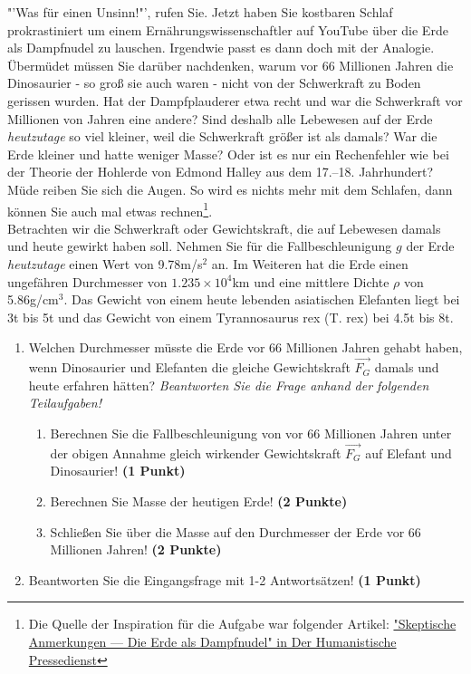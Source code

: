 \documentclass[a4paper, 9pt]{scrartcl}\usepackage[]{graphicx}\usepackage[]{xcolor}
\begin{document}
"'Was für einen Unsinn!"', rufen Sie. Jetzt haben Sie kostbaren Schlaf prokrastiniert um einem Ernährungswissenschaftler auf YouTube über die Erde als Dampfnudel zu lauschen. Irgendwie passt es dann doch mit der Analogie. Übermüdet müssen Sie darüber nachdenken, warum vor 66 Millionen Jahren die Dinosaurier - so groß sie auch waren - nicht von der Schwerkraft zu Boden gerissen wurden. Hat der Dampfplauderer etwa recht und war die Schwerkraft vor Millionen von Jahren eine andere?  Sind deshalb alle Lebewesen auf der Erde \textit{heutzutage} so viel kleiner, weil die Schwerkraft größer ist als damals? War die Erde kleiner und hatte weniger Masse? Oder ist es nur ein Rechenfehler wie bei der Theorie der Hohlerde von Edmond Halley aus dem 17.–18. Jahrhundert? Müde reiben Sie sich die Augen. So wird es nichts mehr mit dem Schlafen, dann können Sie auch mal etwas rechnen\footnote{Die Quelle der Inspiration
  für die Aufgabe war folgender Artikel:
  \href{https://hpd.de/artikel/erde-dampfnudel-22236}{"Skeptische Anmerkungen --- Die Erde als Dampfnudel" in Der Humanistische Pressedienst}}.  \\

Betrachten wir die Schwerkraft oder Gewichtskraft, die auf Lebewesen damals und heute gewirkt haben soll. Nehmen Sie für die Fallbeschleunigung $g$ der Erde \textit{heutzutage} einen Wert von 9.78m/s$^2$ an. Im Weiteren hat die Erde einen ungefähren Durchmesser von \ensuremath{1.235\times 10^{4}}km und eine mittlere Dichte $\rho$ von 5.86g/cm$^3$. Das Gewicht von einem heute lebenden asiatischen Elefanten liegt bei 3t bis 5t und das Gewicht von einem Tyrannosaurus rex (T. rex) bei 4.5t bis 8t.

\begin{enumerate}
\item Welchen Durchmesser müsste die Erde vor 66 Millionen Jahren gehabt haben, wenn Dinosaurier und Elefanten die gleiche Gewichtskraft $\overrightarrow{F_G}$ damals und heute erfahren hätten? \textit{Beantworten Sie die Frage anhand der folgenden Teilaufgaben!}
\begin{enumerate}
\item Berechnen Sie die Fallbeschleunigung von vor 66 Millionen Jahren unter der obigen Annahme gleich wirkender Gewichtskraft $\overrightarrow{F_G}$ auf Elefant und Dinosaurier! \textbf{(1 Punkt)}
\item Berechnen Sie Masse der heutigen Erde! \textbf{(2 Punkte)}
\item Schließen Sie über die Masse auf den Durchmesser der Erde vor 66 Millionen Jahren! \textbf{(2 Punkte)}
\end{enumerate}
\item Beantworten Sie die Eingangsfrage mit 1-2 Antwortsätzen! \textbf{(1 Punkt)}
\end{enumerate}
\end{document}
